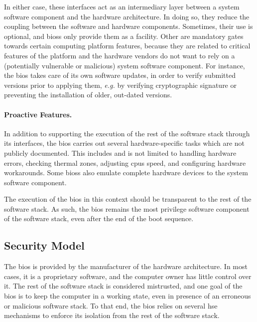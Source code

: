 In either case, these interfaces act as an intermediary layer between a system
software component and the hardware architecture.
%
In doing so, they reduce the coupling between the software and hardware
components.
%
Sometimes, their use is optional, and \acp{bios} only provide them as a
facility.
%
Other are mandatory gates towards certain computing platform features, because
they are related to critical features of the platform and the hardware vendors
do not want to rely on a (potentially vulnerable or malicious) system software
component.
%
For instance, the \ac{bios} takes care of its own software updates, in order to
verify submitted versions prior to applying them, \emph{e.g.} by verifying
cryptographic signature or preventing the installation of older, out-dated
versions.

\paragraph{Proactive Features.}
%
In addition to supporting the execution of the rest of the software stack
through its interfaces, the \ac{bios} carries out several hardware-specific
tasks which are not publicly documented.
%
This includes and is not limited to handling hardware errors, checking thermal
zones, adjusting \acp{cpu} speed, and configuring hardware workarounds.
%
Some \acp{bios} also emulate complete hardware devices to the system software
component.

The execution of the \ac{bios} in this context should be transparent to the rest
of the software stack.
%
As such, the \ac{bios} remains the most privilege software component of the
software stack, even after the end of the boot sequence.

\subsection{Security Model}
\label{subsec:usecase:firm:sec}

The \ac{bios} is provided by the manufacturer of the hardware architecture.
%
In most cases, it is a proprietary software, and the computer owner has little
control over it.
%
The rest of the software stack is considered mistrusted, and one goal of the
\ac{bios} is to keep the computer in a working state, even in presence of an
erroneous or malicious software stack.
%
To that end, the \ac{bios} relies on several \ac{hse} mechanisms to enforce its
isolation from the rest of the software stack.

